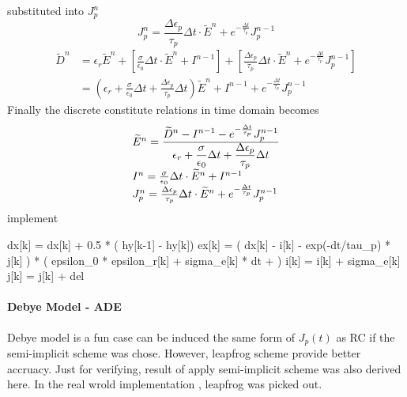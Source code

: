 substituted into $J_p^n$
\begin{equation}
  J_p^n = \frac{\Delta\epsilon_p}{\tau_p}\Delta t\cdot\widetilde{E}^n + e^{-\frac{\Delta t}{\tau_p}} J_p^{n-1}
\end{equation}
\begin{equation}
  \begin{split}
    \widetilde{D}^n & = \epsilon_r\widetilde{E}^n + \left[\frac{\sigma}{\epsilon_0}\Delta t\cdot\widetilde{E}^n + I^{n-1}\right] + \left[\frac{\Delta \epsilon_p}{\tau_p}\Delta t\cdot\widetilde{E}^n + e^{-\frac{\Delta t}{\tau_p}} J_p^{n-1}\right]\\
    & = \left(\epsilon_r + \frac{\sigma}{\epsilon_0}\Delta t + \frac{\Delta\epsilon_p}{\tau_p}\Delta t\right)\widetilde{E}^n + I^{n-1} + e^{-\frac{\Delta t}{\tau_p}} J_p^{n-1}
  \end{split}
\end{equation}
Finally the discrete constitute relations in time domain becomes
\begin{gather}
  \begin{array}{@{}l@{}}
    \widetilde{E}^n =  \frac{\displaystyle \widetilde{D}^n - I^{n-1} - e^{-\frac{\Delta t}{\tau_p}}J_p^{n-1} }{\displaystyle \epsilon_r + \frac{\sigma}{\epsilon_0}\Delta t + \frac{\Delta \epsilon_p}{\tau_p} \Delta t}\\    
    I^n = \frac{\sigma}{\epsilon_0}\Delta t\cdot\widetilde{E}^n + I^{n-1}\\
    J_p^n = \frac{\Delta\epsilon_p}{\tau_p}\Delta t\cdot\widetilde{E}^n + e^{-\frac{\Delta t}{\tau_p}} J_p^{n-1}
  \end{array}
\end{gather}
implement
\begin{code}
  dx[k] = dx[k] + 0.5 * ( hy[k-1] - hy[k])
  ex[k] = ( dx[k] - i[k] - exp(-dt/tau_p) * j[k] ) 
  * ( epsilon_0 * epsilon_r[k] + sigma_e[k] * dt +  )
  i[k] = i[k] + sigma_e[k] 
  j[k] = j[k] + del
\end{code}



\paragraph{{\msjh Debye Model - ADE}}
Debye model is a fun case can be induced the same form of $J_p(t)$ as RC if the semi-implicit scheme was chose. However,
leapfrog scheme provide better accruacy. Just for verifying, result of apply semi-implicit scheme was also derived
here. In the real wrold implementation \textit{}, leapfrog was picked out.

